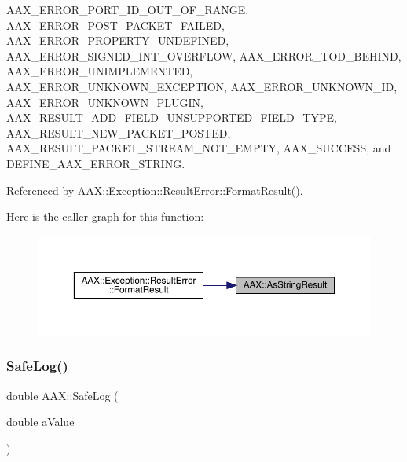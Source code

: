 A\+A\+X\+\_\+\+E\+R\+R\+O\+R\+\_\+\+P\+O\+R\+T\+\_\+\+I\+D\+\_\+\+O\+U\+T\+\_\+\+O\+F\+\_\+\+R\+A\+N\+GE, A\+A\+X\+\_\+\+E\+R\+R\+O\+R\+\_\+\+P\+O\+S\+T\+\_\+\+P\+A\+C\+K\+E\+T\+\_\+\+F\+A\+I\+L\+ED, A\+A\+X\+\_\+\+E\+R\+R\+O\+R\+\_\+\+P\+R\+O\+P\+E\+R\+T\+Y\+\_\+\+U\+N\+D\+E\+F\+I\+N\+ED, A\+A\+X\+\_\+\+E\+R\+R\+O\+R\+\_\+\+S\+I\+G\+N\+E\+D\+\_\+\+I\+N\+T\+\_\+\+O\+V\+E\+R\+F\+L\+OW, A\+A\+X\+\_\+\+E\+R\+R\+O\+R\+\_\+\+T\+O\+D\+\_\+\+B\+E\+H\+I\+ND, A\+A\+X\+\_\+\+E\+R\+R\+O\+R\+\_\+\+U\+N\+I\+M\+P\+L\+E\+M\+E\+N\+T\+ED, A\+A\+X\+\_\+\+E\+R\+R\+O\+R\+\_\+\+U\+N\+K\+N\+O\+W\+N\+\_\+\+E\+X\+C\+E\+P\+T\+I\+ON, A\+A\+X\+\_\+\+E\+R\+R\+O\+R\+\_\+\+U\+N\+K\+N\+O\+W\+N\+\_\+\+ID, A\+A\+X\+\_\+\+E\+R\+R\+O\+R\+\_\+\+U\+N\+K\+N\+O\+W\+N\+\_\+\+P\+L\+U\+G\+IN, A\+A\+X\+\_\+\+R\+E\+S\+U\+L\+T\+\_\+\+A\+D\+D\+\_\+\+F\+I\+E\+L\+D\+\_\+\+U\+N\+S\+U\+P\+P\+O\+R\+T\+E\+D\+\_\+\+F\+I\+E\+L\+D\+\_\+\+T\+Y\+PE, A\+A\+X\+\_\+\+R\+E\+S\+U\+L\+T\+\_\+\+N\+E\+W\+\_\+\+P\+A\+C\+K\+E\+T\+\_\+\+P\+O\+S\+T\+ED, A\+A\+X\+\_\+\+R\+E\+S\+U\+L\+T\+\_\+\+P\+A\+C\+K\+E\+T\+\_\+\+S\+T\+R\+E\+A\+M\+\_\+\+N\+O\+T\+\_\+\+E\+M\+P\+TY, A\+A\+X\+\_\+\+S\+U\+C\+C\+E\+SS, and D\+E\+F\+I\+N\+E\+\_\+\+A\+A\+X\+\_\+\+E\+R\+R\+O\+R\+\_\+\+S\+T\+R\+I\+NG.



Referenced by A\+A\+X\+::\+Exception\+::\+Result\+Error\+::\+Format\+Result().

Here is the caller graph for this function\+:
\nopagebreak
\begin{figure}[H]
\begin{center}
\leavevmode
\includegraphics[width=350pt]{a00852_a354029650cebc5f23636c9984a65ea0d_icgraph}
\end{center}
\end{figure}
\mbox{\label{a00852_ae8de30637f08cd29bb0e27526ce9e21b}} 
\subsubsection{\texorpdfstring{SafeLog()}{SafeLog()}}
{\footnotesize\ttfamily double A\+A\+X\+::\+Safe\+Log (\begin{DoxyParamCaption}\item[{double}]{a\+Value }\end{DoxyParamCaption})\hspace{0.3cm}{\ttfamily [inline]}}



